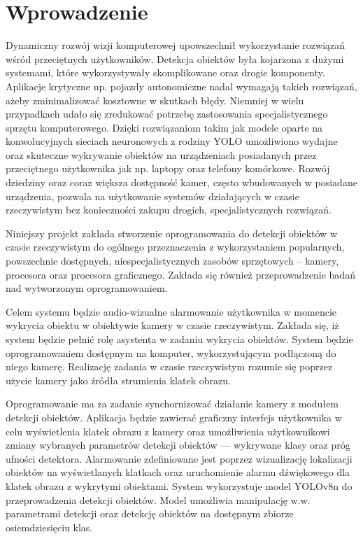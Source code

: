\chapter{Wprowadzenie}
Dynamiczny rozwój wizji komputerowej upowszechnił wykorzystanie rozwiązań wśród przeciętnych użytkowników. Detekcja obiektów była kojarzona z dużymi systemami, które wykorzystywały skomplikowane oraz drogie komponenty. Aplikacje krytyczne np. pojazdy autonomiczne nadal wymagają takich rozwiązań, ażeby zminimalizować kosztowne w skutkach błędy. Niemniej w wielu przypadkach udało się zredukować potrzebę  zastosowania specjalistycznego sprzętu komputerowego. Dzięki rozwiązaniom takim jak modele oparte na konwolucyjnych sieciach neuronowych z rodziny YOLO umożliwiono wydajne oraz skuteczne wykrywanie obiektów na urządzeniach posiadanych przez przeciętnego użytkownika jak np. laptopy oraz telefony komórkowe. Rozwój dziedziny oraz coraz większa dostępność kamer, często wbudowanych w posiadane urządzenia, pozwala na użytkowanie systemów działających w czasie rzeczywistym bez konieczności zakupu drogich, specjalistycznych rozwiązań. 

Niniejszy projekt zakłada stworzenie oprogramowania do detekcji obiektów w czasie rzeczywistym do ogólnego przeznaczenia z wykorzystaniem popularnych, powszechnie dostępnych, niespecjalistycznych zasobów sprzętowych -- kamery, procesora oraz procesora graficznego. Zakłada się również przeprowadzenie badań nad wytworzonym oprogramowaniem.

Celem systemu będzie audio-wizualne alarmowanie użytkownika w momencie wykrycia obiektu w obiektywie kamery w czasie rzeczywistym. Zakłada się, iż system będzie pełnić rolę asystenta w zadaniu wykrycia obiektów. 
System będzie oprogramowaniem dostępnym na komputer, wykorzystującym podłączoną do niego kamerę. Realizację zadania w czasie rzeczywistym rozumie się poprzez użycie kamery jako źródła strumienia klatek obrazu. 

Oprogramowanie ma za zadanie synchornizować działanie kamery z modułem detekcji obiektów. Aplikacja będzie zawierać graficzny interfejs użytkownika w celu wyświetlenia klatek obrazu z kamery oraz umożliwienia użytkownikowi zmiany wybranych parametrów detekcji obiektów --- wykrywane klasy oraz próg ufności detektora. Alarmowanie zdefiniowane jest poprzez wizualizację lokalizacji obiektów na wyświetlanych klatkach oraz uruchomienie alarmu dźwiękowego dla klatek obrazu z wykrytymi obiektami. System wykorzystuje model YOLOv8n do przeprowadzenia detekcji obiektów. Model umożliwia manipulację w.w. parametrami detekcji oraz detekcję obiektów na dostępnym zbiorze osiemdziesięciu klas.  


